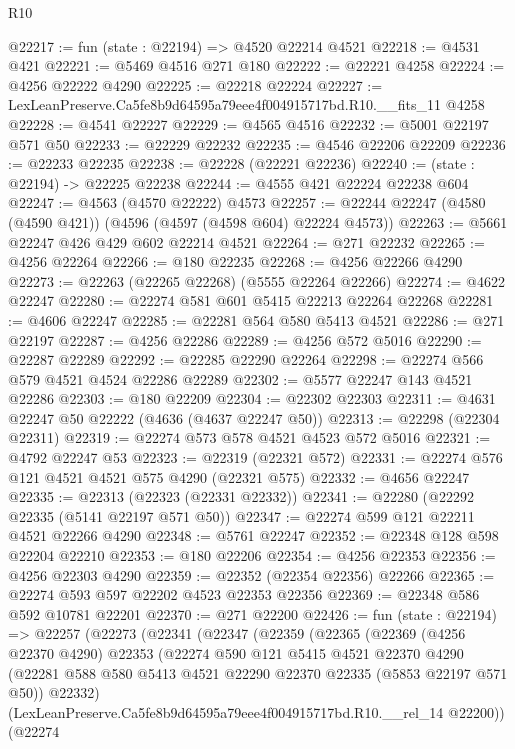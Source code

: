 \begin{lexlean}{R10}
\begin{coremodule}
@22217 := fun (state : @22194) => @4520 @22214 @4521
@22218 := @4531 @421
@22221 := @5469 @4516 @271 @180
@22222 := @22221 @4258
@22224 := @4256 @22222 @4290
@22225 := @22218 @22224
@22227 := LexLeanPreserve.Ca5fe8b9d64595a79eee4f004915717bd.R10.__fits_11 @4258
@22228 := @4541 @22227
@22229 := @4565 @4516
@22232 := @5001 @22197 @571 @50
@22233 := @22229 @22232
@22235 := @4546 @22206 @22209
@22236 := @22233 @22235
@22238 := @22228 (@22221 @22236)
@22240 := (state : @22194) -> @22225 @22238
@22244 := @4555 @421 @22224 @22238 @604
@22247 := @4563 (@4570 @22222) @4573
@22257 := @22244 @22247 (@4580 (@4590 @421)) (@4596 (@4597 (@4598 @604) @22224 @4573))
@22263 := @5661 @22247 @426 @429 @602 @22214 @4521
@22264 := @271 @22232
@22265 := @4256 @22264
@22266 := @180 @22235
@22268 := @4256 @22266 @4290
@22273 := @22263 (@22265 @22268) (@5555 @22264 @22266)
@22274 := @4622 @22247
@22280 := @22274 @581 @601 @5415 @22213 @22264 @22268
@22281 := @4606 @22247
@22285 := @22281 @564 @580 @5413 @4521
@22286 := @271 @22197
@22287 := @4256 @22286
@22289 := @4256 @572 @5016
@22290 := @22287 @22289
@22292 := @22285 @22290 @22264
@22298 := @22274 @566 @579 @4521 @4524 @22286 @22289
@22302 := @5577 @22247 @143 @4521 @22286
@22303 := @180 @22209
@22304 := @22302 @22303
@22311 := @4631 @22247 @50 @22222 (@4636 (@4637 @22247 @50))
@22313 := @22298 (@22304 @22311)
@22319 := @22274 @573 @578 @4521 @4523 @572 @5016
@22321 := @4792 @22247 @53
@22323 := @22319 (@22321 @572)
@22331 := @22274 @576 @121 @4521 @4521 @575 @4290 (@22321 @575)
@22332 := @4656 @22247
@22335 := @22313 (@22323 (@22331 @22332))
@22341 := @22280 (@22292 @22335 (@5141 @22197 @571 @50))
@22347 := @22274 @599 @121 @22211 @4521 @22266 @4290
@22348 := @5761 @22247
@22352 := @22348 @128 @598 @22204 @22210
@22353 := @180 @22206
@22354 := @4256 @22353
@22356 := @4256 @22303 @4290
@22359 := @22352 (@22354 @22356) @22266
@22365 := @22274 @593 @597 @22202 @4523 @22353 @22356
@22369 := @22348 @586 @592 @10781 @22201
@22370 := @271 @22200
@22426 := fun (state : @22194) =>
  @22257
    (@22273
      (@22341
        (@22347
          (@22359
            (@22365
              (@22369
                (@4256 @22370 @4290)
                @22353
                (@22274
                  @590
                  @121
                  @5415
                  @4521
                  @22370
                  @4290
                  (@22281 @588 @580 @5413 @4521 @22290 @22370 @22335 (@5853 @22197 @571 @50))
                  @22332)
                (LexLeanPreserve.Ca5fe8b9d64595a79eee4f004915717bd.R10.__rel_14 @22200))
              (@22274

\end{coremodule}
\end{lexlean}
